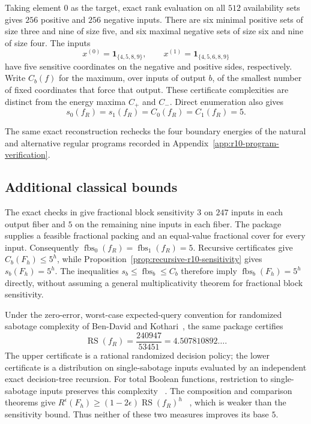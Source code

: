 \documentclass[11pt]{article}
\numberwithin{equation}{section}
\theoremstyle{remark}
\begin{document}
Taking element $0$ as the target, exact rank evaluation on all $512$
availability sets gives $256$ positive and $256$ negative inputs. There are
six minimal positive sets of size three and nine of size five, and six
maximal negative sets of size six and nine of size four. The inputs
\begin{equation}
    x^{(0)}=\mathbf 1_{\{4,5,8,9\}},
    \qquad
    x^{(1)}=\mathbf 1_{\{4,5,6,8,9\}}
\end{equation}
have five sensitive coordinates on the negative and positive sides,
respectively. Write $C_b(f)$ for the maximum, over inputs of output $b$,
of the smallest number of fixed coordinates that force that output.
These certificate complexities are distinct from the energy maxima $C_+$
and $C_-$. Direct enumeration also gives
\begin{equation}
    s_0(f_R)=s_1(f_R)=C_0(f_R)=C_1(f_R)=5.
    \label{eq:r10-recursive-base-sensitivity}
\end{equation}

The same exact reconstruction rechecks the four boundary energies of the
natural and alternative regular programs recorded in
Appendix~\ref{app:r10-program-verification}.

\subsection{Additional classical bounds}
\label{app:r10-classical-stress}

The exact checks in  give fractional block
sensitivity $3$ on $247$ inputs in each output fiber and $5$ on the remaining
nine inputs in each fiber. The package supplies a feasible fractional packing
and an equal-value fractional cover for every input. Consequently
$\operatorname{fbs}_0(f_R)=\operatorname{fbs}_1(f_R)=5$.
Recursive certificates give $C_b(F_h)\leq5^h$, while
Proposition~\ref{prop:recursive-r10-sensitivity} gives $s_b(F_h)=5^h$.
The inequalities $s_b\leq\operatorname{fbs}_b\leq C_b$ therefore imply
$\operatorname{fbs}_b(F_h)=5^h$ directly, without assuming a general
multiplicativity theorem for fractional block sensitivity.

Under the zero-error, worst-case expected-query convention for randomized
sabotage complexity of Ben-David and Kothari~\cite{BenDavidKothari2018Sabotage},
the same package certifies
\[
 \operatorname{RS}(f_R)=\frac{240947}{53451}=4.507810892\ldots.
\]
The upper certificate is a rational randomized decision policy; the lower
certificate is a distribution on single-sabotage inputs evaluated by an
independent exact decision-tree recursion. For total Boolean functions,
restriction to single-sabotage inputs preserves this complexity
~\cite[Thm.~3.6]{BenDavidKothari2018Sabotage}. The composition and comparison
theorems give
$R^\epsilon(F_h)\geq(1-2\epsilon)\operatorname{RS}(f_R)^h$
~\cite[Thms.~3.4 and 4.5]{BenDavidKothari2018Sabotage}, which is weaker than
the sensitivity bound. Thus neither of these two measures improves its base
$5$.
\end{document}
